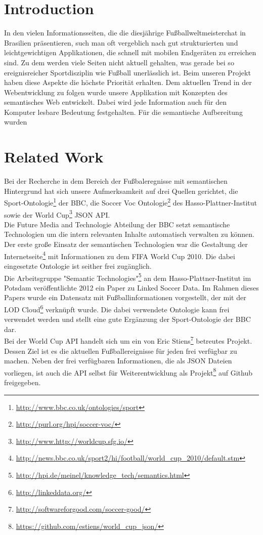 \documentclass[runningheads,a4paper]{llncs}
\begin{document}
\section{Introduction}

In den vielen Informationsseiten, die die diesjährige Fußballweltmeisterchat in Brasilien präsentieren, such man oft vergeblich nach gut strukturierten und leichtgewichtigen Applikationen, die schnell mit mobilen Endgeräten zu erreichen sind. Zu dem werden viele Seiten nicht aktuell gehalten, was gerade bei so ereignisreicher Sportdisziplin wie Fußball unerlässlich ist. Beim unseren Projekt haben diese Aspekte die höchste Priorität erhalten. Dem aktuellen Trend in der Webentwicklung zu folgen wurde unsere Applikation mit Konzepten des semantisches Web entwickelt. Dabei wird jede Information auch für den Komputer lesbare Bedeutung festgehalten. Für die semantische Aufbereitung wurden      


\section{Related Work}

Bei der Recherche in dem Bereich der Fußbaleregnisse mit semantischen Hintergrund hat sich unsere Aufmerksamkeit auf drei Quellen gerichtet, die Sport-Ontologie\footnote{\url{http://www.bbc.co.uk/ontologies/sport}} der BBC, die Soccer Voc Ontologie\footnote{\url{http://purl.org/hpi/soccer-voc/}} des Hasso-Plattner-Institut sowie der World Cup\footnote{\url{http://www.http://worldcup.sfg.io/}} JSON API.\\ Die Future Media and Technologie Abteilung der BBC setzt semantische Technologien um die intern relevanten Inhalte automatisch verwalten zu können. Der erste große Einsatz der semantischen Technologien war die Gestaltung der Internetseite\footnote{\url{http://news.bbc.co.uk/sport2/hi/football/world_cup_2010/default.stm}} mit Informationen zu dem FIFA World Cup 2010. Die dabei eingesetzte Ontologie ist seither frei zugänglich. \\
Die Arbeitsgruppe "Semantic Technologies"\footnote{\url{http://hpi.de/meinel/knowledge_tech/semantics.html}} an dem Hasso-Plattner-Institut im Potsdam veröffentlichte 2012 ein Paper zu Linked Soccer Data\cite{url_lsd}. Im Rahmen dieses Papers wurde ein Datensatz mit Fußballinformationen vorgestellt, der mit der LOD Cloud\footnote{\url{http://linkeddata.org/}} verknüpft wurde. Die dabei verwendete Ontologie kann frei verwendet werden und stellt eine gute Ergänzung der Sport-Ontologie der BBC dar.\\
Bei der World Cup API handelt sich um ein von Eric Stiens\footnote{\url{http://softwareforgood.com/soccer-good/}} betreutes Projekt. Dessen Ziel ist es die aktuellen Fußballereignisse für jeden frei verfügbar zu machen. Neben der frei verfügbaren Informationen, die als JSON Dateien vorliegen, ist auch die API selbst für Weiterentwicklung als Projekt\footnote{\url{https://github.com/estiens/world_cup_json/}} auf Github freigegeben. 
\end{document}
